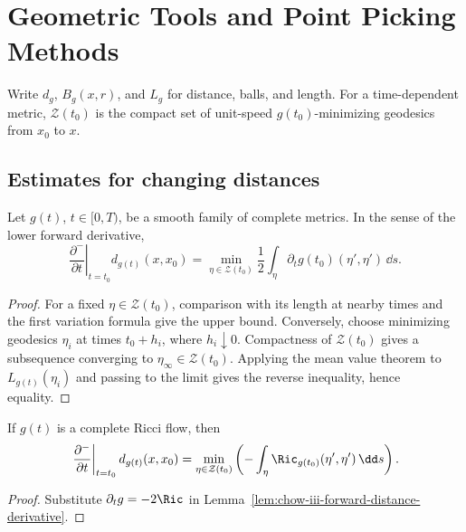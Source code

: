 \chapter[18]{Geometric Tools and Point Picking Methods}
\label{ch:chow-iii-geometric-tools-point-picking}

Write \(d_g\), \(B_g(x,r)\), and \(L_g\) for distance, balls, and length.
For a time-dependent metric, \(\mathcal Z(t_0)\) is the compact set of
unit-speed \(g(t_0)\)-minimizing geodesics from \(x_0\) to \(x\).

\section{Estimates for changing distances}

\begin{lemma}
\label{lem:chow-iii-forward-distance-derivative}
Let \(g(t)\), \(t\in[0,T)\), be a smooth family of complete metrics.  In the
sense of the lower forward derivative,
\[
 \left.\frac{\partial^-}{\partial t}\right|_{t=t_0}d_{g(t)}(x,x_0)
 =\min_{\eta\in\mathcal Z(t_0)}\frac12\int_\eta
 \partial_tg(t_0)(\eta',\eta')\,\dd s .
\]
\end{lemma}
\begin{proof}
\sketch For a fixed \(\eta\in\mathcal Z(t_0)\), comparison with its length at nearby
times and the first variation formula give the upper bound.  Conversely,
choose minimizing geodesics \(\eta_i\) at times \(t_0+h_i\), where
\(h_i\downarrow0\).  Compactness of \(\mathcal Z(t_0)\) gives a subsequence
converging to \(\eta_\infty\in\mathcal Z(t_0)\).  Applying the mean value
theorem to \(L_{g(t)}(\eta_i)\) and passing to the limit gives the reverse
inequality, hence equality.
\end{proof}

\begin{corollary}
\label{cor:chow-iii-forward-distance-derivative-ricci-flow}
If \(g(t)\) is a complete Ricci flow, then
\[
 \left.\frac{\partial^-}{\partial t}\right|_{t=t_0}d_{g(t)}(x,x_0)
 =\min_{\eta\in\mathcal Z(t_0)}
 \left(-\int_\eta\Ric_{g(t_0)}(\eta',\eta')\,\dd s\right).
\]
\end{corollary}
\begin{proof}
\sketch Substitute \(\partial_tg=-2\Ric\) in
Lemma~\ref{lem:chow-iii-forward-distance-derivative}.
\end{proof}

